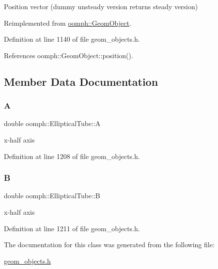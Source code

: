 Position vector (dummy unsteady version returns steady version) 



Reimplemented from \hyperlink{classoomph_1_1GeomObject_ad44a736d23dcd63af163a7d80b5c4dfa}{oomph\+::\+Geom\+Object}.



Definition at line 1140 of file geom\+\_\+objects.\+h.



References oomph\+::\+Geom\+Object\+::position().



\subsection{Member Data Documentation}
\mbox{\label{classoomph_1_1EllipticalTube_a419f48b14f3e3bc1c884983fc3a7b2ae}} 
\subsubsection{\texorpdfstring{A}{A}}
{\footnotesize\ttfamily double oomph\+::\+Elliptical\+Tube\+::A\hspace{0.3cm}{\ttfamily [private]}}



x-\/half axis 



Definition at line 1208 of file geom\+\_\+objects.\+h.

\mbox{\label{classoomph_1_1EllipticalTube_a07babc26d001d03e9048bd3bae1581c1}} 
\subsubsection{\texorpdfstring{B}{B}}
{\footnotesize\ttfamily double oomph\+::\+Elliptical\+Tube\+::B\hspace{0.3cm}{\ttfamily [private]}}



x-\/half axis 



Definition at line 1211 of file geom\+\_\+objects.\+h.



The documentation for this class was generated from the following file\+:\begin{DoxyCompactItemize}
\item 
\hyperlink{geom__objects_8h}{geom\+\_\+objects.\+h}\end{DoxyCompactItemize}
